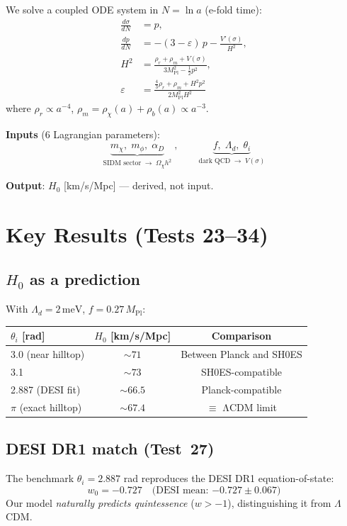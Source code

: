 \documentclass[11pt,a4paper]{article}
\newcommand{\Mpl}{M_{\mathrm{Pl}}}
\newcommand{\Ld}{\Lambda_d}
\newcommand{\meV}{\,\mathrm{meV}}
\begin{document}
We solve a coupled ODE system in $N = \ln a$ (e-fold time):
\begin{align}
  \frac{d\sigma}{dN} &= p, \\
  \frac{dp}{dN} &= -(3-\varepsilon)\,p - \frac{V'(\sigma)}{H^2}, \\
  H^2 &= \frac{\rho_r + \rho_m + V(\sigma)}{3\Mpl^2 - \tfrac{1}{2}p^2}, \\
  \varepsilon &= \frac{\tfrac{4}{3}\rho_r + \rho_m + H^2 p^2}{2\Mpl^2 H^2}
\end{align}
where $\rho_r\propto a^{-4}$, $\rho_m = \rho_\chi(a) + \rho_b(a) \propto a^{-3}$.

\medskip
\noindent
\textbf{Inputs} (6 Lagrangian parameters):
\[
  \underbrace{m_\chi,\;m_\phi,\;\alpha_D}_{\text{SIDM sector}\;\to\;\Omega_\chi h^2}
  \;,\qquad
  \underbrace{f,\;\Ld,\;\theta_i}_{\text{dark QCD}\;\to\;V(\sigma)}
\]

\noindent
\textbf{Output}: $H_0$ [km/s/Mpc] --- derived, not input.

\section{Key Results (Tests 23--34)}

\subsection{$H_0$ as a prediction}
With $\Ld=2\meV$, $f=0.27\,\Mpl$:
\begin{center}
\begin{tabular}{@{}lcc@{}}
\toprule
$\theta_i$ [rad] & $H_0$ [km/s/Mpc] & Comparison \\
\midrule
3.0 (near hilltop) & $\sim71$ & Between Planck and SH0ES \\
3.1               & $\sim73$ & SH0ES-compatible \\
2.887 (DESI fit)  & $\sim66.5$ & Planck-compatible \\
$\pi$ (exact hilltop) & $\sim67.4$ & $\equiv$ ΛCDM limit \\
\bottomrule
\end{tabular}
\end{center}

\subsection{DESI DR1 match (Test~27)}
The benchmark $\theta_i=2.887$ rad reproduces the DESI DR1 equation-of-state:
\begin{equation}
  w_0 = -0.727 \quad\text{(DESI mean: $-0.727 \pm 0.067$)}
\end{equation}
Our model \emph{naturally predicts quintessence} ($w > -1$), distinguishing it from $\Lambda$CDM.
\end{document}
